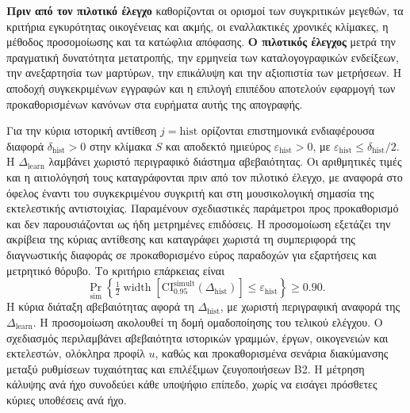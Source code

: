 \documentclass[11pt,a4paper]{article}
\begin{document}
\textbf{Πριν από τον πιλοτικό έλεγχο} καθορίζονται οι ορισμοί των συγκριτικών μεγεθών, τα κριτήρια εγκυρότητας οικογένειας και ακμής, οι εναλλακτικές χρονικές κλίμακες, η μέθοδος προσομοίωσης και τα κατώφλια απόφασης. \textbf{Ο πιλοτικός έλεγχος} μετρά την πραγματική δυνατότητα μετατροπής, την ερμηνεία των καταλογογραφικών ενδείξεων, την ανεξαρτησία των μαρτύρων, την επικάλυψη και την αξιοπιστία των μετρήσεων. Η αποδοχή συγκεκριμένων εγγραφών και η επιλογή επιπέδου αποτελούν εφαρμογή των προκαθορισμένων κανόνων στα ευρήματα αυτής της απογραφής.

Για την κύρια ιστορική αντίθεση $j=\mathrm{hist}$ ορίζονται επιστημονικά ενδιαφέρουσα διαφορά $\delta_{\mathrm{hist}}>0$ στην κλίμακα $S$ και αποδεκτό ημιεύρος $\varepsilon_{\mathrm{hist}}>0$, με $\varepsilon_{\mathrm{hist}}\leq\delta_{\mathrm{hist}}/2$. Η $\Delta_{\mathrm{learn}}$ λαμβάνει χωριστό περιγραφικό διάστημα αβεβαιότητας. Οι αριθμητικές τιμές και η αιτιολόγησή τους καταγράφονται πριν από τον πιλοτικό έλεγχο, με αναφορά στο όφελος έναντι του συγκεκριμένου συγκριτή και στη μουσικολογική σημασία της εκτελεστικής αντιστοιχίας. Παραμένουν σχεδιαστικές παράμετροι προς προκαθορισμό και δεν παρουσιάζονται ως ήδη μετρημένες επιδόσεις. Η προσομοίωση εξετάζει την ακρίβεια της κύριας αντίθεσης και καταγράφει χωριστά τη συμπεριφορά της διαγνωστικής διαφοράς σε προκαθορισμένο εύρος παραδοχών για εξαρτήσεις και μετρητικό θόρυβο. Το κριτήριο επάρκειας είναι
\[
\Pr_{\mathrm{sim}}\!\left\{
\tfrac12\operatorname{width}\!\left[\mathrm{CI}_{0.95}^{\mathrm{simult}}(\Delta_{\mathrm{hist}})\right]
\leq\varepsilon_{\mathrm{hist}}
\right\}\geq 0.90.
\]
Η κύρια διάταξη αβεβαιότητας αφορά τη $\Delta_{\mathrm{hist}}$, με χωριστή περιγραφική αναφορά της $\Delta_{\mathrm{learn}}$. Η προσομοίωση ακολουθεί τη δομή ομαδοποίησης του τελικού ελέγχου. Ο σχεδιασμός περιλαμβάνει αβεβαιότητα ιστορικών γραμμών, έργων, οικογενειών και εκτελεστών, ολόκληρα προφίλ $u$, καθώς και προκαθορισμένα σενάρια διακύμανσης μεταξύ ρυθμίσεων τυχαιότητας και επιλέξιμων ζευγοποιήσεων B2. Η μέτρηση κάλυψης ανά ήχο συνοδεύει κάθε υποψήφιο επίπεδο, χωρίς να εισάγει πρόσθετες κύριες υποθέσεις ανά ήχο.
\end{document}
